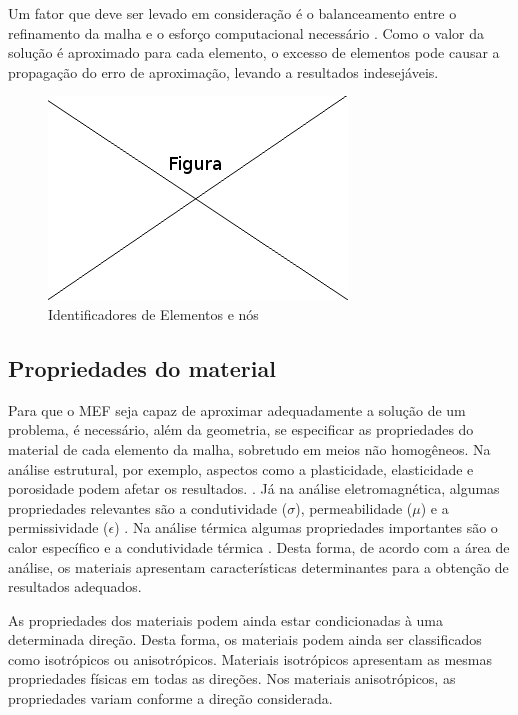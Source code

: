 Um fator que deve ser levado em consideração é o balanceamento entre o refinamento da malha e o esforço computacional necessário \citep[p. 154]{desai}. Como o valor da solução é aproximado para cada elemento, o excesso de elementos pode causar a propagação do erro de aproximação, levando a resultados indesejáveis.


\begin{figure}[!htb]
\centering
\includegraphics[scale=0.5]{figuras/temp.png}
\caption{Identificadores de Elementos e nós}
\label{fig:numeracao}
\end{figure}

\subsection{Propriedades do material}
Para que o MEF seja capaz de aproximar adequadamente a solução de um problema, é necessário, além da geometria, se especificar as propriedades do material de cada elemento da malha, sobretudo em meios não homogêneos. Na análise estrutural, por exemplo, aspectos como a plasticidade, elasticidade e porosidade podem afetar os resultados. \citep[p. 250]{desai}. Já na análise eletromagnética, algumas propriedades relevantes são a condutividade ($\sigma$), permeabilidade ($\mu$) e a permissividade ($\epsilon$) \citep[p. 3]{volakis}. Na análise térmica algumas propriedades importantes são o calor específico e a condutividade térmica \citep[p. 251]{desai}.
Desta forma, de acordo com a área de análise, os materiais apresentam características determinantes para a obtenção de resultados adequados.

As propriedades dos materiais podem ainda estar condicionadas à uma determinada direção. Desta forma, os materiais podem ainda ser classificados como isotrópicos ou anisotrópicos\citep[p. 20]{sadiku}.  Materiais isotrópicos apresentam as mesmas propriedades físicas em todas as direções. Nos materiais anisotrópicos, as propriedades variam conforme a direção considerada.

